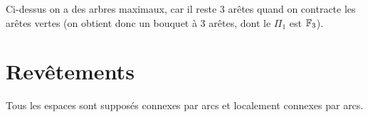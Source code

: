 \begin{exs}
\begin{enumerate}
\begin{center}
        \end{center}
        Ci-dessus on a des arbres maximaux, car il reste 3 arêtes quand on contracte les arêtes vertes (on
        obtient donc un bouquet à 3 arêtes, dont le $\Pi_1$ est $\mathbb{F}_3$).
    \end{enumerate}
  \end{exs}




  \section{Revêtements}
  \label{sec:revetements}


  Tous les espaces sont supposés connexes par arcs et localement connexes par arcs.

